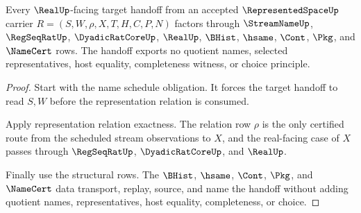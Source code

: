 \begin{theorem}
\label{thm:representedspace-target-handoff-nonescape}
Every $\RealUp$-facing target handoff from an accepted $\RepresentedSpaceUp$ carrier $R=(S,W,\rho,X,T,H,C,P,N)$ factors through $\StreamNameUp$, $\RegSeqRatUp$, $\DyadicRatCoreUp$, $\RealUp$, $\BHist$, $\hsame$, $\Cont$, $\Pkg$, and $\NameCert$ rows. The handoff exports no quotient names, selected representatives, host equality, completeness witness, or choice principle.
\end{theorem}
\begin{proof}
Start with the name schedule obligation. It forces the target handoff to read $S,W$ before the representation relation is consumed.

Apply representation relation exactness. The relation row $\rho$ is the only certified route from the scheduled stream observations to $X$, and the real-facing case of $X$ passes through $\RegSeqRatUp$, $\DyadicRatCoreUp$, and $\RealUp$.

Finally use the structural rows. The $\BHist$, $\hsame$, $\Cont$, $\Pkg$, and $\NameCert$ data transport, replay, source, and name the handoff without adding quotient names, representatives, host equality, completeness, or choice.
\end{proof}


